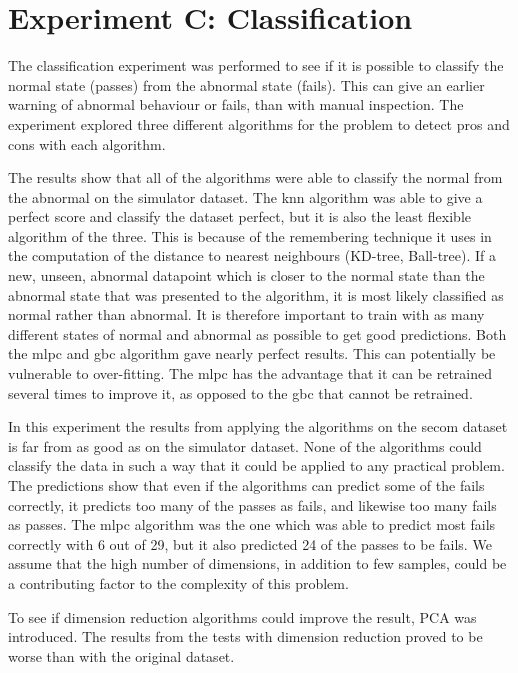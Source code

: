 \documentclass[english, a4paper]{report}
\begin{document}
{    \section{Experiment C: Classification}
    {
        The classification experiment was performed to see if it is possible to classify the normal state (passes) from the abnormal state (fails). This can give an earlier warning of abnormal behaviour or fails, than with manual inspection. The experiment explored three different algorithms for the problem to detect pros and cons with each algorithm. 
        \par
        The results show that all of the algorithms were able to classify the normal from the abnormal on the simulator dataset. The \gls{knn} algorithm was able to give a perfect score and classify the dataset perfect, but it is also the least flexible algorithm of the three. This is because of the remembering technique it uses in the computation of the distance to nearest neighbours (KD-tree, Ball-tree). If a new, unseen, abnormal datapoint which is closer to the normal state than the abnormal state that was presented to the algorithm, it is most likely classified as normal rather than abnormal. It is therefore important to train with as many different states of normal and abnormal as possible to get good predictions. Both the \gls{mlpc} and \gls{gbc} algorithm gave nearly perfect results. This can potentially be vulnerable to over-fitting. The \gls{mlpc} has the advantage that it can be retrained several times to improve it, as opposed to the \gls{gbc} that cannot be retrained.
        \par
        In this experiment the results from applying the algorithms on the \gls{secom} dataset is far from as good as on the simulator dataset. None of the algorithms could classify the data in such a way that it could be applied to any practical problem. The predictions show that even if the algorithms can predict some of the fails correctly, it predicts too many of the passes as fails, and likewise too many fails as passes. The \gls{mlpc} algorithm was the one which was able to predict most fails correctly with 6 out of 29, but it also predicted 24 of the passes to be fails. We assume that the high number of dimensions, in addition to few samples, could be a contributing factor to the complexity of this problem.
        \par
        To see if dimension reduction algorithms could improve the result, PCA was introduced. The results from the tests with dimension reduction proved to be worse than with the original dataset.       
    }
    
}
\end{document}
